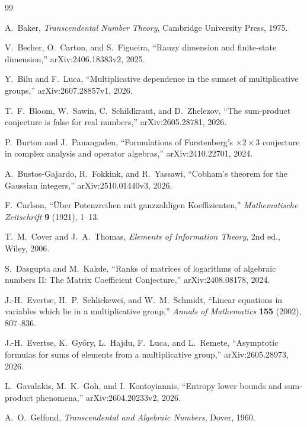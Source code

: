 \documentclass[11pt,oneside]{article}
\theoremstyle{definition}
\theoremstyle{remark}
\begin{document}
\begin{thebibliography}{99}

A.~Baker,
\emph{Transcendental Number Theory},
Cambridge University Press, 1975.

V.~Becher, O.~Carton, and S.~Figueira,
``Rauzy dimension and finite-state dimension,''
arXiv:2406.18383v2, 2025.

Y.~Bilu and F.~Luca,
``Multiplicative dependence in the sumset of multiplicative groups,''
arXiv:2607.28857v1, 2026.

T.~F.~Bloom, W.~Sawin, C.~Schildkraut, and D.~Zhelezov,
``The sum-product conjecture is false for real numbers,''
arXiv:2605.28781, 2026.

P.~Burton and J.~Panangaden,
``Formulations of Furstenberg's $\times2\times3$ conjecture in complex analysis and operator algebras,''
arXiv:2410.22701, 2024.

A.~Bustos-Gajardo, R.~Fokkink, and R.~Yassawi,
``Cobham's theorem for the Gaussian integers,''
arXiv:2510.01440v3, 2026.

F.~Carlson,
``\"Uber Potenzreihen mit ganzzahligen Koeffizienten,''
\emph{Mathematische Zeitschrift} \textbf{9} (1921), 1--13.

T.~M.~Cover and J.~A.~Thomas,
\emph{Elements of Information Theory}, 2nd ed.,
Wiley, 2006.

S.~Dasgupta and M.~Kakde,
``Ranks of matrices of logarithms of algebraic numbers II: The Matrix Coefficient Conjecture,''
arXiv:2408.08178, 2024.

J.-H.~Evertse, H.~P.~Schlickewei, and W.~M.~Schmidt,
``Linear equations in variables which lie in a multiplicative group,''
\emph{Annals of Mathematics} \textbf{155} (2002), 807--836.

J.-H.~Evertse, K.~Gy\H{o}ry, L.~Hajdu, F.~Luca, and L.~Remete,
``Asymptotic formulas for sums of elements from a multiplicative group,''
arXiv:2605.28973, 2026.

L.~Gavalakis, M.~K.~Goh, and I.~Kontoyiannis,
``Entropy lower bounds and sum-product phenomena,''
arXiv:2604.20233v2, 2026.

A.~O.~Gelfond,
\emph{Transcendental and Algebraic Numbers},
Dover, 1960.


\end{thebibliography}
\end{document}
